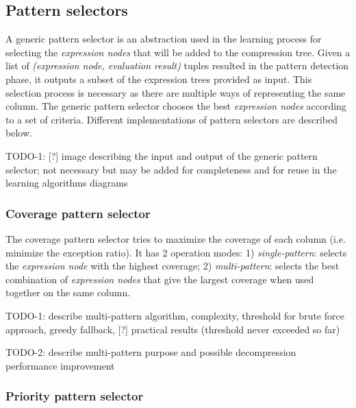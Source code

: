 \subsection{Pattern selectors}
\label{sub:learning:selectors}




% 

A generic pattern selector is an abstraction used in the learning process for selecting the \textit{expression nodes} that will be added to the compression tree. Given a list of \textit{(expression node, evaluation result)} tuples resulted in the pattern detection phase, it outputs a subset of the expression trees provided as input. This selection process is necessary as there are multiple ways of representing the same column. The generic pattern selector chooses the best \textit{expression nodes} according to a set of criteria. Different implementations of pattern selectors are described below.

TODO-1: [?] image describing the input and output of the generic pattern selector; not necessary but may be added for completeness and for reuse in the learning algorithms diagrams

\subsubsection{Coverage pattern selector}
\label{subsubsec:ps:coverage}

The coverage pattern selector tries to maximize the coverage of each column (i.e. minimize the exception ratio). It has 2 operation modes: 1) \textit{single-pattern}: selects the \textit{expression node} with the highest coverage; 2) \textit{multi-pattern}: selects the best combination of \textit{expression nodes} that give the largest coverage when used together on the same column.

TODO-1: describe multi-pattern algorithm, complexity, threshold for brute force approach, greedy fallback, [?] practical results (threshold never exceeded so far)

TODO-2: describe multi-pattern purpose and possible decompression performance improvement

\subsubsection{Priority pattern selector}
\label{subsubsec:ps:priority}

